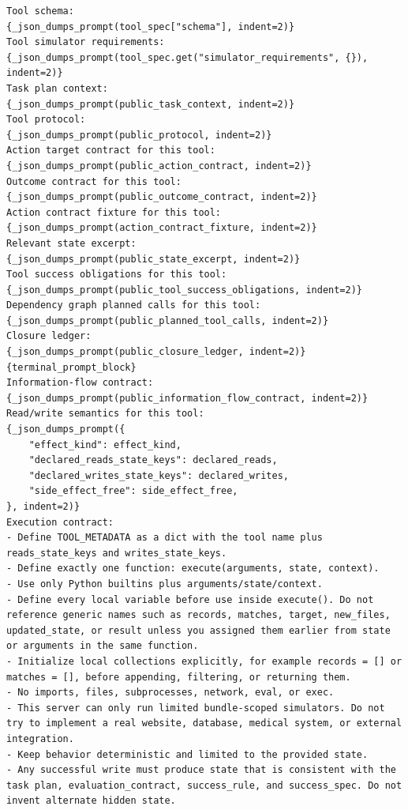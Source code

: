 \documentclass{llmxive}
\begin{document}
\begin{tcolorbox}[promptbox,title={Tool-Code Generator Prompt}]

\begin{Verbatim}[breaklines=true, breakanywhere=true, fontsize=\scriptsize, breaksymbolleft={}]
Tool schema:
{_json_dumps_prompt(tool_spec["schema"], indent=2)}
Tool simulator requirements:
{_json_dumps_prompt(tool_spec.get("simulator_requirements", {}), indent=2)}
Task plan context:
{_json_dumps_prompt(public_task_context, indent=2)}
Tool protocol:
{_json_dumps_prompt(public_protocol, indent=2)}
Action target contract for this tool:
{_json_dumps_prompt(public_action_contract, indent=2)}
Outcome contract for this tool:
{_json_dumps_prompt(public_outcome_contract, indent=2)}
Action contract fixture for this tool:
{_json_dumps_prompt(action_contract_fixture, indent=2)}
Relevant state excerpt:
{_json_dumps_prompt(public_state_excerpt, indent=2)}
Tool success obligations for this tool:
{_json_dumps_prompt(public_tool_success_obligations, indent=2)}
Dependency graph planned calls for this tool:
{_json_dumps_prompt(public_planned_tool_calls, indent=2)}
Closure ledger:
{_json_dumps_prompt(public_closure_ledger, indent=2)}
{terminal_prompt_block}
Information-flow contract:
{_json_dumps_prompt(public_information_flow_contract, indent=2)}
Read/write semantics for this tool:
{_json_dumps_prompt({
    "effect_kind": effect_kind,
    "declared_reads_state_keys": declared_reads,
    "declared_writes_state_keys": declared_writes,
    "side_effect_free": side_effect_free,
}, indent=2)}
Execution contract:
- Define TOOL_METADATA as a dict with the tool name plus reads_state_keys and writes_state_keys.
- Define exactly one function: execute(arguments, state, context).
- Use only Python builtins plus arguments/state/context.
- Define every local variable before use inside execute(). Do not reference generic names such as records, matches, target, new_files, updated_state, or result unless you assigned them earlier from state or arguments in the same function.
- Initialize local collections explicitly, for example records = [] or matches = [], before appending, filtering, or returning them.
- No imports, files, subprocesses, network, eval, or exec.
- This server can only run limited bundle-scoped simulators. Do not try to implement a real website, database, medical system, or external integration.
- Keep behavior deterministic and limited to the provided state.
- Any successful write must produce state that is consistent with the task plan, evaluation_contract, success_rule, and success_spec. Do not invent alternate hidden state.

\end{Verbatim}
\end{tcolorbox}
\end{document}
